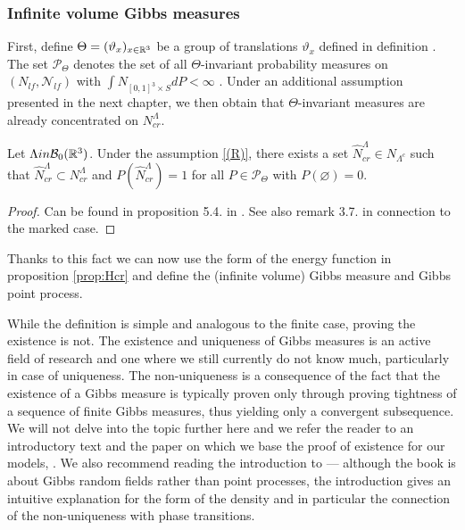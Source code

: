 \subsubsection{Infinite volume Gibbs measures}

First, define $\Theta=(\vartheta_x)_{x\in {\mathbb R^3}}$ be a group of translations $\vartheta_x$ defined in definition \label{def:potential}. The set $\mathcal P_\Theta$ denotes the set of all $\Theta$-invariant probability measures on $(N_{lf},\mathcal N_{lf})$ with $\int N_{[0,1]^3 \times S} dP< \infty $ . Under an additional assumption presented in the next chapter, we then obtain that $\Theta$-invariant measures are already concentrated on $N^\Lambda_{cr}$.

\begin{proposition}
	Let $\Lambda in \mathcal B_0({\mathbb R^3})$. Under the assumption \ref{(R)}, there exists a set $\hat N^\Lambda_{cr} \in N_{\Lambda^c}$ such that $\hat N^\Lambda_{cr} \subset N^\Lambda_{cr}$ and $P(\hat N^\Lambda_{cr})=1$ for all $P \in \mathcal P_\Theta$ with $P(\varnothing)=0$.
\end{proposition}
\begin{proof}
	Can be found in proposition 5.4. in \cite{DDG12}. See also remark 3.7. in connection to the marked case.
\end{proof}

Thanks to this fact we can now use the form of the energy function in proposition \ref{prop:Hcr} and define the (infinite volume) Gibbs measure and Gibbs point process.

\begin{definition}

\end{definition}


While the definition is simple and analogous to the finite case, proving the existence is not. The existence and uniqueness of Gibbs measures is an active field of research and one where we still currently do not know much, particularly in case of uniqueness. The non-uniqueness is a consequence of the fact that the existence of a Gibbs measure is typically proven only through proving tightness of a sequence of finite Gibbs measures, thus yielding only a convergent subsequence. We will not delve into the topic further here and we refer the reader to an introductory text \cite{Dereudre2017} and the paper on which we base the proof of existence for our models, \cite{DDG12}. We also recommend reading the introduction to \cite{Georgii2011} --- although the book is about Gibbs random fields rather than point processes, the introduction gives an intuitive explanation for the form of the density and in particular the connection of the non-uniqueness with phase transitions.


